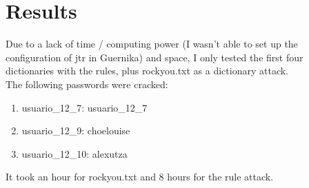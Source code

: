 \section{Results}
Due to a lack of time / computing power (I wasn't able to set up the configuration of jtr in Guernika) and space, I only tested the first four dictionaries with the rules, plus rockyou.txt as a dictionary attack.\\

The following passwords were cracked:
\begin{enumerate}
    \item usuario\_12\_7: usuario\_12\_7
    \item usuario\_12\_9: choelouise
    \item usuario\_12\_10: alexutza
\end{enumerate}

It took an hour for rockyou.txt and 8 hours for the rule attack.
